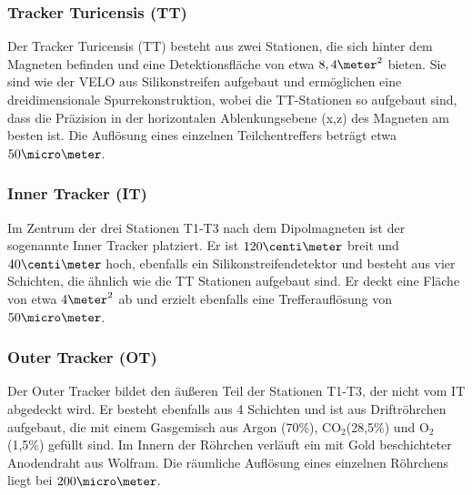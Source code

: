 \subsubsection{Tracker Turicensis (TT)}
Der Tracker Turicensis (TT) besteht aus zwei Stationen, die sich hinter dem Magneten befinden und eine Detektionsfläche von etwa $8,4\meter^2$ bieten. Sie sind wie der VELO aus Silikonstreifen aufgebaut und ermöglichen eine dreidimensionale Spurrekonstruktion, wobei die TT-Stationen so aufgebaut sind, dass die Präzision in der horizontalen Ablenkungsebene (x,z) des Magneten am besten ist. Die Auflösung eines einzelnen Teilchentreffers beträgt etwa $50\micro\meter$.

\subsubsection{Inner Tracker (IT)}
Im Zentrum der drei Stationen T1-T3 nach dem Dipolmagneten ist der sogenannte Inner Tracker platziert. Er ist $120\centi\meter$ breit und $40\centi\meter$ hoch, ebenfalls ein Silikonstreifendetektor und besteht aus vier Schichten, die ähnlich wie die TT Stationen aufgebaut sind. Er deckt eine Fläche von etwa $4\meter^2$ ab und erzielt ebenfalls eine Trefferauflösung von $50\micro\meter$.

\subsubsection{Outer Tracker (OT)}
Der Outer Tracker bildet den äußeren Teil der Stationen T1-T3, der nicht vom IT abgedeckt wird. Er besteht ebenfalls aus 4 Schichten und ist aus Driftröhrchen aufgebaut, die mit einem Gasgemisch aus Argon (70\%), CO$_2$(28,5\%) und O$_2$ (1,5\%) gefüllt sind. Im Innern der Röhrchen verläuft ein mit Gold beschichteter Anodendraht aus Wolfram. Die räumliche Auflösung eines einzelnen Röhrchens liegt bei $200\micro\meter$.

